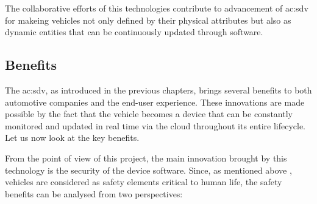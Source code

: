 The collaborative efforts of this technologies contribute to advancement of \gls{ac:sdv} for makeing vehicles not only defined by their physical attributes but also as dynamic entities that can be continuously updated through software.

\subsection{Benefits}
The \gls{ac:sdv}, as introduced in the previous chapters, brings several benefits to both automotive companies and the end-user experience.  These innovations are made possible by the fact that the vehicle becomes a device that can be constantly monitored and updated in real time via the cloud throughout its entire lifecycle. Let us now look at the key benefits.

From the point of view of this project, the main innovation brought by this technology is the security of the device software. Since, as mentioned above \cite{ISO26262}, vehicles are considered as safety elements critical to human life, the safety benefits can be analysed from two perspectives:
